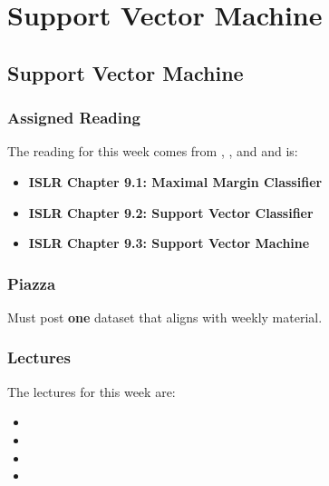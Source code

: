 \clearpage

\renewcommand{\ChapTitle}{Support Vector Machine}
\renewcommand{\SectionTitle}{Support Vector Machine}

\chapter{\ChapTitle}
\section{\SectionTitle}

\subsection{Assigned Reading}

The reading for this week comes from \ISLRPython, \ISLRR, and \ESLII \hspace*{1pt} and is:

\begin{itemize}
    \item \textbf{ISLR Chapter 9.1: Maximal Margin Classifier}
    \item \textbf{ISLR Chapter 9.2: Support Vector Classifier}
    \item \textbf{ISLR Chapter 9.3: Support Vector Machine}
\end{itemize}

\subsection{Piazza}

Must post \textbf{one} dataset that aligns with weekly material.

\subsection{Lectures}

The lectures for this week are:

\begin{itemize}
    \item {}
    \item {}
    \item {}
    \item {}
\end{itemize}

